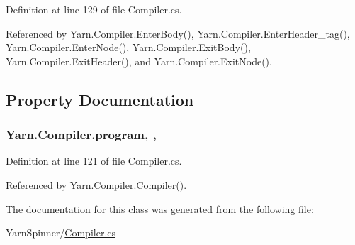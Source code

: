 Definition at line 129 of file Compiler.\-cs.



Referenced by Yarn.\-Compiler.\-Enter\-Body(), Yarn.\-Compiler.\-Enter\-Header\-\_\-tag(), Yarn.\-Compiler.\-Enter\-Node(), Yarn.\-Compiler.\-Exit\-Body(), Yarn.\-Compiler.\-Exit\-Header(), and Yarn.\-Compiler.\-Exit\-Node().



\subsection{Property Documentation}
\hypertarget{a00053_aa1737da428ec7d597009661dd8a47829}{
\subsubsection[{program}]{ Yarn.\-Compiler.\-program\hspace{0.3cm}{\ttfamily [get]}, {\ttfamily [set]}, {\ttfamily [package]}}}\label{a00053_aa1737da428ec7d597009661dd8a47829}


Definition at line 121 of file Compiler.\-cs.



Referenced by Yarn.\-Compiler.\-Compiler().



The documentation for this class was generated from the following file\-:\begin{DoxyCompactItemize}
\item 
Yarn\-Spinner/\hyperlink{a00284}{Compiler.\-cs}\end{DoxyCompactItemize}
